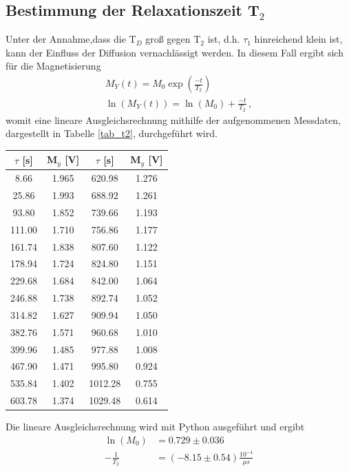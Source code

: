 \documentclass[]{scrartcl}
\begin{document}
\subsection{Bestimmung der Relaxationszeit T$_2$}
Unter der Annahme,dass die T$_D$ groß gegen T$_2$ ist, d.h. $\tau_1$ hinreichend klein ist, kann der Einfluss der Diffusion vernachlässigt werden. In diesem Fall ergibt sich für die Magnetisierung 
\begin{align}
M_Y(t)=M_0\exp\left( \frac{-t}{T_2}\right) \\
\ln(M_Y(t))=\ln(M_0) + \frac{-t}{T_2}\,  ,
\end{align}
womit eine lineare Ausgleichsrechnung mithilfe der aufgenommenen Messdaten, dargestellt in Tabelle \ref{tab_t2}, durchgeführt wird. \\
\begin{center}
	\begin{tabular}{|c|c||c|c|}
		\hline	$\tau$ [s]	&	M$_y$ [V] & $\tau$ [s]	&	M$_y$ [V]\\
		\hline	8.66	&	1.965	&	620.98	&	1.276	\\
		\hline	25.86	&	1.993	&	688.92	&	1.261	\\
		\hline	93.80	&	1.852	&	739.66	&	1.193	\\
		\hline	111.00	&	1.710	&	756.86	&	1.177	\\
		\hline	161.74	&	1.838	&	807.60	&	1.122	\\
		\hline	178.94	&	1.724	&	824.80	&	1.151	\\
		\hline	229.68	&	1.684	&	842.00	&	1.064	\\
		\hline	246.88	&	1.738	&	892.74	&	1.052	\\
		\hline	314.82	&	1.627	&	909.94	&	1.050	\\
		\hline	382.76	&	1.571	&	960.68	&	1.010	\\
		\hline	399.96	&	1.485	&	977.88	&	1.008	\\
		\hline	467.90	&	1.471	&	995.80	&	0.924	\\
		\hline	535.84	&	1.402	&	1012.28	&	0.755	\\
		\hline	603.78	&	1.374	&	1029.48	&	0.614	\\
		\hline
	\end{tabular}
	\label{tab_t2}
\end{center}
Die lineare Ausgleichsrechnung wird mit Python ausgeführt und ergibt 
\begin{align*}
\ln(M_0)&=0.729 \pm 0.036 \\
-\frac{1}{T_2}&= (-8.15 \pm 0.54) \frac{10^{-4}}{\mu s}
\end{align*}
\end{document}
